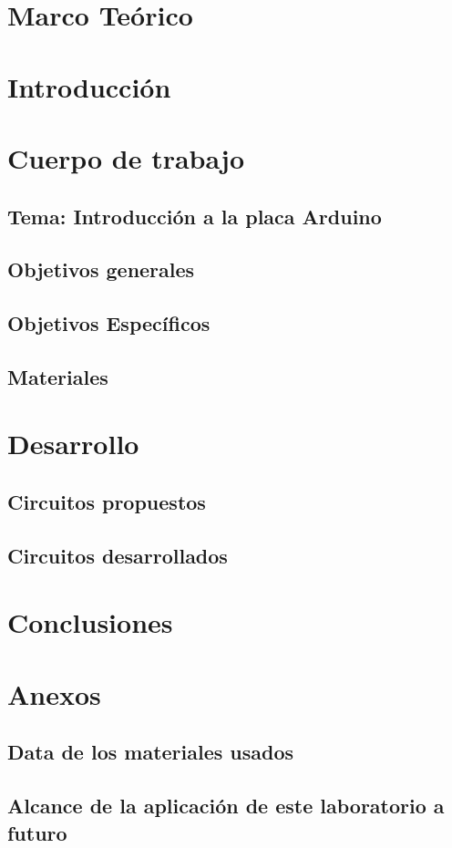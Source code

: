 \documentclass{extbook}
\begin{document}

\tableofcontents
\listoffigures
\chapter{Marco Teórico}

\chapter{Introducción}

\chapter{Cuerpo de trabajo}
\section{Tema: Introducción a la placa Arduino}
\section{Objetivos generales}

\section{Objetivos Específicos}

\section{Materiales}

\chapter{Desarrollo}
\section{Circuitos propuestos}
\section{Circuitos desarrollados}

\chapter{Conclusiones}


\chapter{Anexos}
\section{Data de los materiales usados}

\section{Alcance de la aplicación de este laboratorio a futuro}
\end{document}
